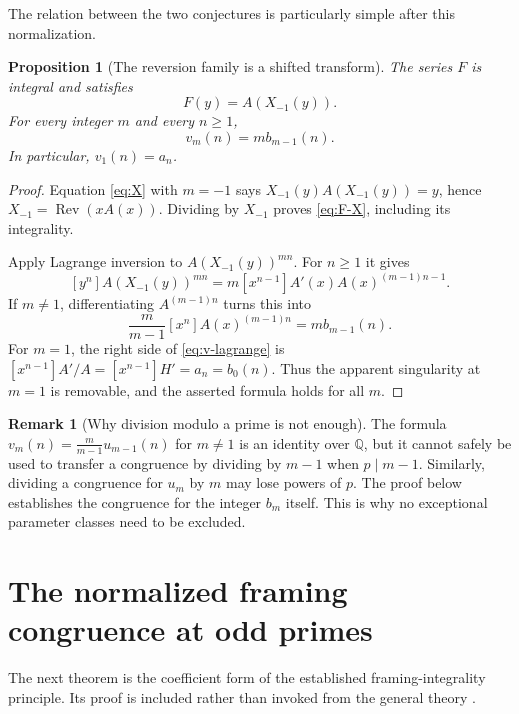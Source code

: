 \documentclass[11pt,letterpaper]{article}
\numberwithin{equation}{section}
\newtheorem{proposition}[theorem]{Proposition}
\theoremstyle{definition}
\newtheorem{remark}[theorem]{Remark}
\newcommand{\Q}{\mathbb Q}
\newcommand{\Rev}{\operatorname{Rev}}
\begin{document}
The relation between the two conjectures is particularly simple after
this normalization.

\begin{proposition}[The reversion family is a shifted transform]\label{prop:V}
The series $F$ is integral and satisfies
\begin{equation}\label{eq:F-X}
F(y)=A(X_{-1}(y)).
\end{equation}
For every integer $m$ and every $n\geq1$,
\begin{equation}\label{eq:V-B}
v_m(n)=m b_{m-1}(n).
\end{equation}
In particular, $v_1(n)=a_n$.
\end{proposition}

\begin{proof}
Equation \eqref{eq:X} with $m=-1$ says
$X_{-1}(y)A(X_{-1}(y))=y$, hence
$X_{-1}=\Rev(xA(x))$. Dividing by $X_{-1}$ proves
\eqref{eq:F-X}, including its integrality.

Apply Lagrange inversion to $A(X_{-1}(y))^{mn}$. For $n\geq1$ it gives
\begin{equation}\label{eq:v-lagrange}
[y^n]A(X_{-1}(y))^{mn}
=m[x^{n-1}]A'(x)A(x)^{(m-1)n-1}.
\end{equation}
If $m\neq1$, differentiating $A^{(m-1)n}$ turns this into
\[
\frac{m}{m-1}[x^n]A(x)^{(m-1)n}=m b_{m-1}(n).
\]
For $m=1$, the right side of \eqref{eq:v-lagrange} is
$[x^{n-1}]A'/A=[x^{n-1}]H'=a_n=b_0(n)$. Thus the apparent singularity
at $m=1$ is removable, and the asserted formula holds for all $m$.
\end{proof}

\begin{remark}[Why division modulo a prime is not enough]
The formula $v_m(n)=\frac{m}{m-1}u_{m-1}(n)$ for $m\neq1$ is an
identity over $\Q$, but it cannot safely be used to transfer a congruence
by dividing by $m-1$ when $p\mid m-1$. Similarly, dividing a congruence
for $u_m$ by $m$ may lose powers of $p$. The proof below establishes the
congruence for the integer $b_m$ itself. This is why no exceptional
parameter classes need to be excluded.
\end{remark}

\section{The normalized framing congruence at odd primes}\label{sec:odd}

The next theorem is the coefficient form of the established
framing-integrality principle. Its proof is included rather than invoked
from the general theory \cite{svw2013,svw2017}.
\end{document}
